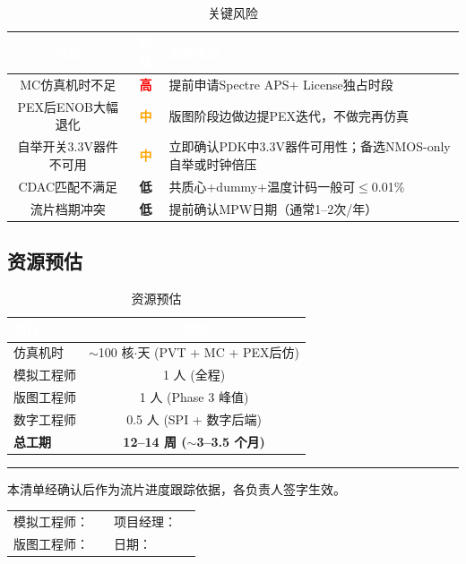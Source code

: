 \documentclass[12pt,a4paper,fontset=none]{ctexart}
\newcommand{\needtable}{\needspace{6cm}}   %
\begin{document}
\begin{table}[H]
\centering
\caption{关键风险}
\footnotesize
\begin{tabular}{@{}ccL{6.8cm}@{}}
\toprule
{}
\textcolor{white}{\textbf{风险}} &
\textcolor{white}{\textbf{等级}} &
\textcolor{white}{\textbf{缓解措施}} \\
\midrule
MC仿真机时不足 & \textcolor{red}{\textbf{高}} & 提前申请Spectre APS$+$ License独占时段 \\
PEX后ENOB大幅退化 & \textcolor{orange}{\textbf{中}} & 版图阶段边做边提PEX迭代，不做完再仿真 \\
自举开关3.3V器件不可用 & \textcolor{orange}{\textbf{中}} & 立即确认PDK中3.3V器件可用性；备选NMOS-only自举或时钟倍压 \\
CDAC匹配不满足 & \textcolor{green!50!black}{\textbf{低}} & 共质心+dummy+温度计码一般可$\le$0.01\% \\
流片档期冲突 & \textcolor{green!50!black}{\textbf{低}} & 提前确认MPW日期（通常1--2次/年） \\
\bottomrule
\end{tabular}
\end{table}

\needtable
\subsection{资源预估}

\begin{table}[H]
\centering
\caption{资源预估}
\begin{tabular}{@{}lc@{}}
\toprule
\rowcolor{tabhead}
\textcolor{white}{\textbf{项目}} &
\textcolor{white}{\textbf{预估}} \\
\midrule
仿真机时 & $\sim$100 核$\cdot$天 (PVT + MC + PEX后仿) \\
模拟工程师 & 1 人 (全程) \\
版图工程师 & 1 人 (Phase 3 峰值) \\
数字工程师 & 0.5 人 (SPI + 数字后端) \\
\midrule
\textbf{总工期} & \textbf{12--14 周 ($\sim$3--3.5 个月)} \\
\bottomrule
\end{tabular}
\end{table}

\vspace{1cm}
\begin{center}
\rule{0.4\textwidth}{0.5pt}

{\large 本清单经确认后作为流片进度跟踪依据，各负责人签字生效。}

\vspace{1cm}

\begin{tabular}{p{3cm}p{3cm}p{3cm}p{3cm}}
模拟工程师： & \underline{\hspace{2.5cm}} & 项目经理： & \underline{\hspace{2.5cm}} \\[1cm]
版图工程师： & \underline{\hspace{2.5cm}} & 日期：     & \underline{\hspace{2.5cm}} \\
\end{tabular}
\end{center}
\end{document}
